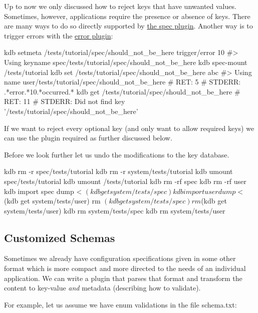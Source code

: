 Up to now we only discussed how to reject keys that have unwanted values. Sometimes, however, applications require the presence or absence of keys. There are many ways to do so directly supported by \hyperlink{md_src_plugins_spec_README_src_plugins_spec_README_md}{the spec plugin}. Another way is to trigger errors with the \hyperlink{md_src_plugins_error_README_src_plugins_error_README_md}{error plugin}\+:


\begin{DoxyCode}
kdb setmeta /tests/tutorial/spec/should\_not\_be\_here trigger/error 10
#> Using keyname spec/tests/tutorial/spec/should\_not\_be\_here
kdb spec-mount /tests/tutorial
kdb set /tests/tutorial/spec/should\_not\_be\_here abc
#> Using name user/tests/tutorial/spec/should\_not\_be\_here
# RET:    5
# STDERR: .*error.*10.*occurred.*
kdb get /tests/tutorial/spec/should\_not\_be\_here
# RET: 11
# STDERR: Did not find key '/tests/tutorial/spec/should\_not\_be\_here'
\end{DoxyCode}


If we want to reject every optional key (and only want to allow required keys) we can use the plugin {\ttfamily required} as further discussed below.

Before we look further let us undo the modifications to the key database.


\begin{DoxyCode}
kdb rm -r spec/tests/tutorial
kdb rm -r system/tests/tutorial
kdb umount spec/tests/tutorial
kdb umount /tests/tutorial
kdb rm -rf spec
kdb rm -rf user
kdb import spec dump < $(kdb get system/tests/spec)
kdb import user dump < $(kdb get system/tests/user)
rm $(kdb get system/tests/spec)
rm $(kdb get system/tests/user)
kdb rm system/tests/spec
kdb rm system/tests/user
\end{DoxyCode}


\subsection*{Customized Schemas}

Sometimes we already have configuration specifications given in some other format which is more compact and more directed to the needs of an individual application. We can write a plugin that parses that format and transform the content to key-\/value {\itshape and} metadata (describing how to validate).

For example, let us assume we have enum validations in the file {\ttfamily schema.\+txt}\+:



